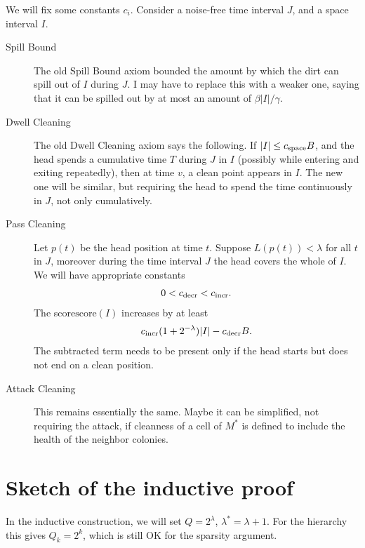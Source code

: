 \documentclass[12pt]{memoir}
\renewcommand{\le}{\leq}
\def\B{B}
\newcommand{\score}{\mathrm{score}}
\newcommand{\Tu}{T}
\newcommand{\Cns}[2]{#1_{\textrm{\upshape #2}}}
\newcommand{\cns}[1]{\Cns{c}{#1}}
\newcommand{\cSpace}{\cns{space}}
\newcommand{\cDecr}{\cns{decr}}
\newcommand{\cIncr}{\cns{incr}}
\begin{document}
We will fix some  constants \( c_{i} \).
Consider a noise-free time interval \( J \), and a space interval \( I \).

\begin{description}
\item[Spill Bound] 
The old Spill Bound axiom bounded the amount by which the dirt can spill out
of \( I \) during \( J \).
I may have to replace this with a weaker one, saying
that it can be spilled out by at most an amount of \( \beta |I|/\gamma \).

\item[Dwell Cleaning]
The old Dwell Cleaning axiom says the following.
If \( |I| \le \cSpace\B \), and the head spends a cumulative time  \( \Tu \)  during \( J \)
in \( I \) (possibly while entering and exiting repeatedly),
then at time \( v \), a clean point appears in \( I \).
The new one will be similar, but requiring the head to spend the time continuously in \( J \),
not only cumulatively.


\item[Pass Cleaning]
Let \( p(t) \) be the head position at time \( t \).
Suppose \( L(p(t))<\lambda \) for all \( t \) in \( J \), moreover
during the time interval \( J \) the head covers the whole of \( I \).
We will have appropriate constants 
\begin{align*}
   0<\cDecr<\cIncr.
 \end{align*}
The score\( \score(I) \) increases by at least 
\begin{align*}
 \cIncr(1+2^{-\lambda})|I|-\cDecr\B .
 \end{align*}
The subtracted term needs to be present only if the head starts but does not end
on a clean position.

\item[Attack Cleaning]
This remains essentially the same.
Maybe it can be  simplified, not requiring the attack, if cleanness of a cell of \( M^{*} \) is
defined to include the health of the neighbor colonies.
\end{description}


\section{Sketch of the inductive proof}

In the inductive construction, we will set \( Q=2^{\lambda} \), \( \lambda^{*}=\lambda+1 \).
For the hierarchy this gives \( Q_{k}=2^{k} \), which is still OK for the sparsity argument.
\end{document}
